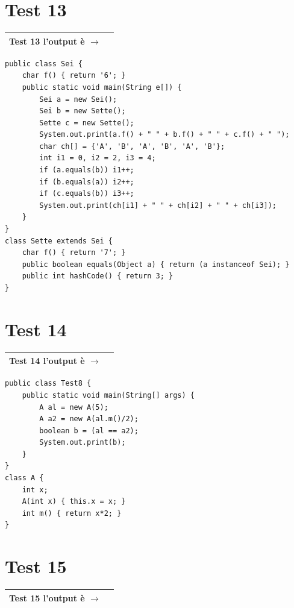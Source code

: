 \documentclass[a4paper,12pt]{article}
\newcommand{\outputbox}[1]{%
  \vspace{0.4em}
  \noindent
  \begin{tabular}{|l|p{10cm}|}
    \hline
    \rule{0pt}{1.8em}\textbf{#1} \quad l'output è $\rightarrow$ & \phantom{XXXXXXXXXXXXXXXXXXX} \\
    \hline
  \end{tabular}
  \vspace{0.4em}
}
\begin{document}
 
\section*{Test 13}
\outputbox{Test 13}
 
\begin{lstlisting}[style=java]
public class Sei {
    char f() { return '6'; }
    public static void main(String e[]) {
        Sei a = new Sei();
        Sei b = new Sette();
        Sette c = new Sette();
        System.out.print(a.f() + " " + b.f() + " " + c.f() + " ");
        char ch[] = {'A', 'B', 'A', 'B', 'A', 'B'};
        int i1 = 0, i2 = 2, i3 = 4;
        if (a.equals(b)) i1++;
        if (b.equals(a)) i2++;
        if (c.equals(b)) i3++;
        System.out.print(ch[i1] + " " + ch[i2] + " " + ch[i3]);
    }
}
class Sette extends Sei {
    char f() { return '7'; }
    public boolean equals(Object a) { return (a instanceof Sei); }
    public int hashCode() { return 3; }
}
\end{lstlisting}
 

\section*{Test 14}
\outputbox{Test 14}
 
\begin{lstlisting}[style=java]
public class Test8 {
    public static void main(String[] args) {
        A al = new A(5);
        A a2 = new A(al.m()/2);
        boolean b = (al == a2);
        System.out.print(b);
    }
}
class A {
    int x;
    A(int x) { this.x = x; }
    int m() { return x*2; }
}
\end{lstlisting}
 

\section*{Test 15}
\outputbox{Test 15}
 
\end{document}
